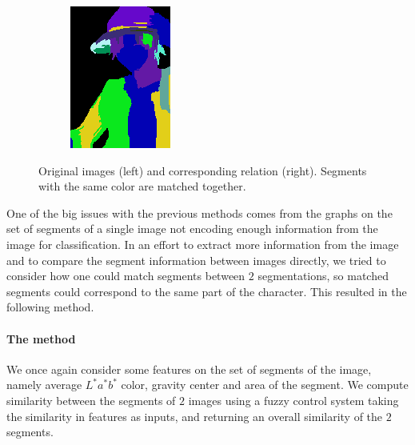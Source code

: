 \begin{figure}[htb!]
\begin{subfigure}{0.24\textwidth}
\includegraphics[width=\textwidth]{images/luffy_match2.png}
\end{subfigure}
\caption{Original images (left) and corresponding relation (right). Segments with the same color are matched together.}
\end{figure}

One of the big issues with the previous methods comes from the graphs on the set of segments of a single image not encoding enough information from the image for classification. In an effort to extract more information from the image and to compare the segment information between images directly, we tried to consider how one could match segments between $2$ segmentations, so matched segments could correspond to the same part of the character. This resulted in the following method.

\paragraph{The method} We once again consider some features on the set of segments of the image, namely average $L^*a^*b^*$ color, gravity center and area of the segment. We compute similarity between the segments of $2$ images using a fuzzy control system taking the similarity in features as inputs, and returning an overall similarity of the $2$ segments.

